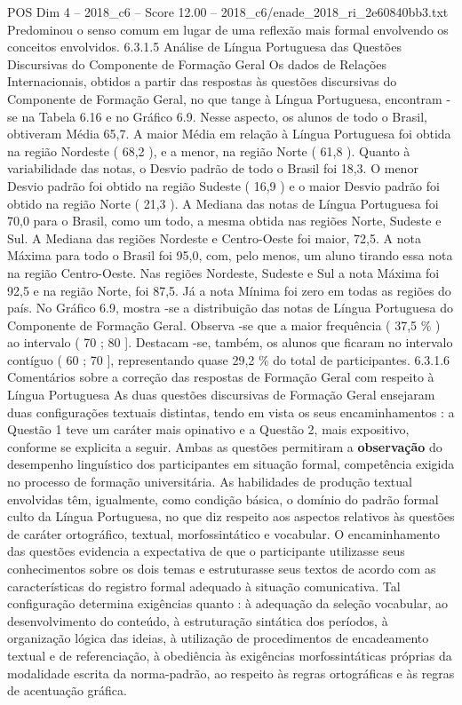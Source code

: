 \begin{textsample}{POS Dim 4 – 2018\_c6 – Score 12.00 – 2018\_c6/enade\_2018\_ri\_2e60840bb3.txt}
Predominou o senso comum em lugar de uma reflexão mais formal envolvendo os conceitos envolvidos. 6.3.1.5 Análise de Língua Portuguesa das Questões Discursivas do Componente de Formação Geral Os dados de Relações Internacionais, obtidos a partir das respostas às questões discursivas do Componente de Formação Geral, no que tange à Língua Portuguesa, encontram -se na Tabela 6.16 e no Gráfico 6.9.
Nesse aspecto, os alunos de todo o Brasil, obtiveram Média 65,7.
A maior Média em relação à Língua Portuguesa foi obtida na região Nordeste ( 68,2 ), e a menor, na região Norte ( 61,8 ).
Quanto à variabilidade das notas, o Desvio padrão de todo o Brasil foi 18,3.
O menor Desvio padrão foi obtido na região Sudeste ( 16,9 ) e o maior Desvio padrão foi obtido na região Norte ( 21,3 ).
A Mediana das notas de Língua Portuguesa foi 70,0 para o Brasil, como um todo, a mesma obtida nas regiões Norte, Sudeste e Sul.
A Mediana das regiões Nordeste e Centro-Oeste foi maior, 72,5.
A nota Máxima para todo o Brasil foi 95,0, com, pelo menos, um aluno tirando essa nota na região Centro-Oeste.
Nas regiões Nordeste, Sudeste e Sul a nota Máxima foi 92,5 e na região Norte, foi 87,5.
Já a nota Mínima foi zero em todas as regiões do país.
No Gráfico 6.9, mostra -se a distribuição das notas de Língua Portuguesa do Componente de Formação Geral.
Observa -se que a maior frequência ( 37,5 \% ) ao intervalo ( 70 ; 80 ].
Destacam -se, também, os alunos que ficaram no intervalo contíguo ( 60 ; 70 ], representando quase 29,2 \% do total de participantes. 6.3.1.6 Comentários sobre a correção das respostas de Formação Geral com respeito à Língua Portuguesa As duas questões discursivas de Formação Geral ensejaram duas configurações textuais distintas, tendo em vista os seus encaminhamentos : a Questão 1 teve um caráter mais opinativo e a Questão 2, mais expositivo, conforme se explicita a seguir.
Ambas as questões permitiram a \textbf{observação} do desempenho linguístico dos participantes em situação formal, competência exigida no processo de formação universitária.
As habilidades de produção textual envolvidas têm, igualmente, como condição básica, o domínio do padrão formal culto da Língua Portuguesa, no que diz respeito aos aspectos relativos às questões de caráter ortográfico, textual, morfossintático e vocabular.
O encaminhamento das questões evidencia a expectativa de que o participante utilizasse seus conhecimentos sobre os dois temas e estruturasse seus textos de acordo com as características do registro formal adequado à situação comunicativa.
Tal configuração determina exigências quanto : à adequação da seleção vocabular, ao desenvolvimento do conteúdo, à estruturação sintática dos períodos, à organização lógica das ideias, à utilização de procedimentos de encadeamento textual e de referenciação, à obediência às exigências morfossintáticas próprias da modalidade escrita da norma-padrão, ao respeito às regras ortográficas e às regras de acentuação gráfica.

\end{textsample}
